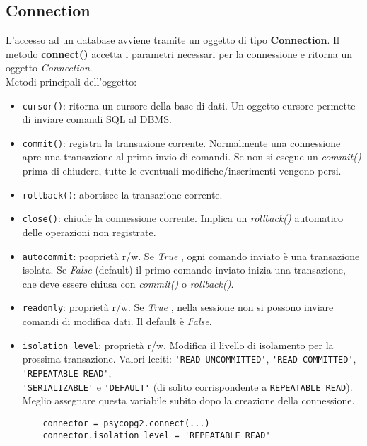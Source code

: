 \documentclass[a4paper, 10pt, titlepage]{article}
\begin{document}
	\subsection{Connection}
	L'accesso ad un database avviene tramite un oggetto di tipo \textbf{Connection}. Il metodo \textbf{connect()} accetta i parametri necessari per la connessione e ritorna un oggetto \textit{Connection}.\\
	Metodi principali dell'oggetto:
	\begin{itemize}
	\item \lstinline|cursor()|: ritorna un cursore della base di dati. Un oggetto cursore permette di inviare comandi SQL al DBMS.
	\item \lstinline[keywordstyle=\color{black}]|commit()|: registra la transazione corrente. Normalmente una connessione apre una transazione al primo invio di comandi. Se non si esegue un \textit{commit()} prima di chiudere, tutte le eventuali modifiche/inserimenti vengono persi.
	\item \lstinline[keywordstyle=\color{black}]|rollback()|: abortisce la transazione corrente.
	\item \lstinline|close()|: chiude la connessione corrente. Implica un \textit{rollback()} automatico delle operazioni non registrate.
	\item \lstinline|autocommit|: proprietà r/w. Se \textit{True} , ogni comando inviato è una transazione isolata. Se \textit{False} (default) il primo comando inviato inizia una transazione, che deve essere chiusa con \textit{commit()} o \textit{rollback()}.
	\item \lstinline|readonly|: proprietà r/w. Se \textit{True} , nella sessione non si possono inviare comandi di modifica dati. Il default è \textit{False}.
	\item \lstinline|isolation_level|: proprietà r/w. Modifica il livello di isolamento per la prossima transazione. Valori leciti: \lstinline|'READ UNCOMMITTED'|, \lstinline|'READ COMMITTED'|,  \lstinline|'REPEATABLE READ'|, \\ \lstinline|'SERIALIZABLE'| e  \lstinline|'DEFAULT'| (di solito corrispondente a \lstinline[keywordstyle=\color{black}]|REPEATABLE READ|). \\
 Meglio assegnare questa variabile subito dopo la creazione della connessione.
	\begin{lstlisting}
	connector = psycopg2.connect(...)
	connector.isolation_level = 'REPEATABLE READ'
	\end{lstlisting}
	\end{itemize}
	
\end{document}
